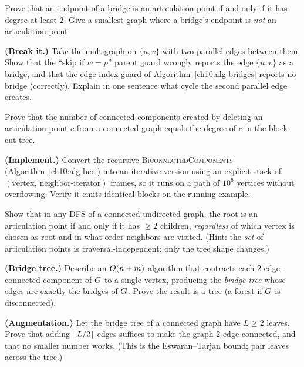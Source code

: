 \begin{exercise}
Prove that an endpoint of a bridge is an articulation point if and only if it has degree
at least $2$. Give a smallest graph where a bridge's endpoint is \emph{not} an
articulation point.
\end{exercise}

\begin{exercise}
\textbf{(Break it.)} Take the multigraph on $\{u,v\}$ with two parallel edges between
them. Show that the ``skip if $w=p$'' parent guard wrongly reports the edge $\{u,v\}$
as a bridge, and that the edge-index guard of Algorithm~\ref{ch10:alg-bridges} reports
no bridge (correctly). Explain in one sentence what cycle the second parallel edge
creates.
\end{exercise}

\begin{exercise}
Prove that the number of connected components created by deleting an articulation point
$c$ from a connected graph equals the degree of $c$ in the block-cut tree.
\end{exercise}

\begin{exercise}
\textbf{(Implement.)} Convert the recursive \textsc{BiconnectedComponents}
(Algorithm~\ref{ch10:alg-bcc}) into an iterative version using an explicit stack of
$(\text{vertex},\ \text{neighbor-iterator})$ frames, so it runs on a path of $10^6$
vertices without overflowing. Verify it emits identical blocks on the running example.
\end{exercise}

\begin{exercise}
Show that in any DFS of a connected undirected graph, the root is an articulation point
if and only if it has $\ge2$ children, \emph{regardless} of which vertex is chosen as root and in
what order neighbors are visited. (Hint: the \emph{set} of articulation points is
traversal-independent; only the tree shape changes.)
\end{exercise}

\begin{exercise}
\textbf{(Bridge tree.)} Describe an $O(n+m)$ algorithm that contracts each
$2$-edge-connected component of $G$ to a single vertex, producing the \emph{bridge
tree} whose edges are exactly the bridges of $G$. Prove the result is a tree (a
forest if $G$ is disconnected).
\end{exercise}

\begin{exercise}
\textbf{(Augmentation.)} Let the bridge tree of a connected graph have $L\ge2$ leaves.
Prove that adding $\lceil L/2\rceil$ edges suffices to make the graph $2$-edge-connected, and
that no smaller number works. (This is the Eswaran--Tarjan bound; pair leaves across the
tree.)
\end{exercise}

